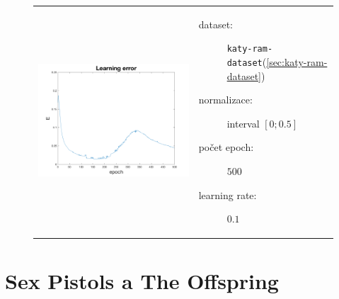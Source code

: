 \documentclass[thesis=M,czech]{FITthesis}[2012/06/26]
\begin{document}
\begin{figure}[htbp]
\begin{tabular}{p{}p{}}
    \begin{minipage}{.5\textwidth}
    \centering
    \includegraphics[scale=0.3]{err_katy-ram.png}
    \label{fig:fig1}
    \end{minipage}
    &
    \begin{minipage}{.5\textwidth}
		\begin{description}
            \item[dataset:] \texttt{katy-ram-dataset}(\ref{sec:katy-ram-dataset})
            \item[normalizace:] interval $[0;0.5]$
            \item[počet epoch:] $500$
            \item[learning rate:] $0.1$
        \end{description}
\end{minipage}
\end{tabular}
\end{figure}



\section{Sex Pistols a The Offspring}\label{exp:sexp-off}
\end{document}
